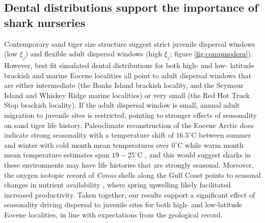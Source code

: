 \documentclass[]{rsos}%
\begin{document}
\subsection{Dental distributions support the importance of shark nurseries} %
Contemporary sand tiger size structure suggest strict juvenile dispersal windows (low $\xi_j$) and flexible adult dispersal windows (high $\xi_j$; figure \ref{fig:compmodern}).
However, best fit simulated dental distributions for both high- and low- latitude brackish and marine Eocene localities all point to adult dispersal windows that are either intermediate (the Banks Island brackish locality, and the Seymour Island and Whiskey Ridge marine localities) or very small (the Red Hot Truck Stop brackish locality).
If the adult dispersal window is small, annual adult migration to juvenile sites is restricted, pointing to stronger effects of seasonality on sand tiger life history.
Paleoclimate reconstruction of the Eocene Arctic does indicate strong seasonality with a temperature shift of $16.5^\circ$C between summer and winter with cold month mean temperatures over $0^\circ$C while warm month mean temperature estimates span $19-25^\circ$C  \cite{basinger1994early,eberle2010seasonal, sluijs2009warm, west2015arctic, west2020paleobotanical}, and this would suggest sharks in these environments may have life histories that are strongly seasonal.
Moreover, the oxygen isotopic record of \emph{Conus} shells along the Gulf Coast points to seasonal changes in nutrient availability \cite{kobashi2003oxygen}, where spring upwelling likely facilitated increased productivity.
Taken together, our results support a significant effect of seasonality driving dispersal to juvenile sites for both high- and low-latitude Eocene localities, in line with expectations from the geological record.
\end{document}
